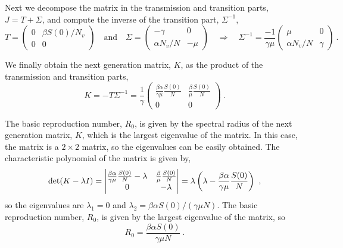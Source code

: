 Next we decompose the matrix in the transmission and transition parts,
$J=T+\Sigma$, and compute the inverse of the transition part, $\Sigma^{-1}$,
\begin{equation}
  T=\begin{pmatrix}
    0 & \beta S(0)/N_v \\
    0 & 0
  \end{pmatrix} \quad \text{and} \quad
  \Sigma=\begin{pmatrix}
    -\gamma      & 0    \\
    \alpha N_v/N & -\mu
  \end{pmatrix} \quad \Longrightarrow \quad
  \Sigma^{-1}=\frac{-1}{\gamma\mu}\begin{pmatrix}
    \mu          & 0      \\
    \alpha N_v/N & \gamma
  \end{pmatrix} \ .
\end{equation}

We finally obtain the next generation matrix, $K$, as the product of the
transmission and transition parts,
\begin{equation}
  K=-T\Sigma^{-1}=\frac{1}{\gamma}\begin{pmatrix}
    \frac{\beta\alpha}{\gamma\mu}\frac{S(0)}{N} &
    \frac{\beta}{\mu}\frac{S(0)}{N}                 \\
    0                                           & 0
  \end{pmatrix} \ .
\end{equation}

The basic reproduction number, $R_0$, is given by the spectral radius of the
next generation matrix, $K$, which is the largest eigenvalue of the matrix. In
this case, the matrix is a $2\times2$ matrix, so the eigenvalues can be easily
obtained. The characteristic polynomial of the matrix is given by,
\begin{equation}
  \det(K-\lambda I)=\begin{vmatrix}
    \frac{\beta\alpha}{\gamma\mu}\frac{S(0)}{N}-\lambda &
    \frac{\beta}{\mu}\frac{S(0)}{N}                                \\
    0                                                   & -\lambda

  \end{vmatrix}=\lambda\left(\lambda-\frac{\beta\alpha}{\gamma\mu}
    \frac{S(0)}{N}\right)
  \ ,
\end{equation}
so the eigenvalues are $\lambda_1=0$ and $\lambda_2=\beta\alpha S(0)/(\gamma\mu
  N)$. The basic reproduction number, $R_0$, is given by the largest eigenvalue
of the matrix, so
\begin{equation}
  R_0=\frac{\beta\alpha S(0)}{\gamma\mu N} \ .
\end{equation}


